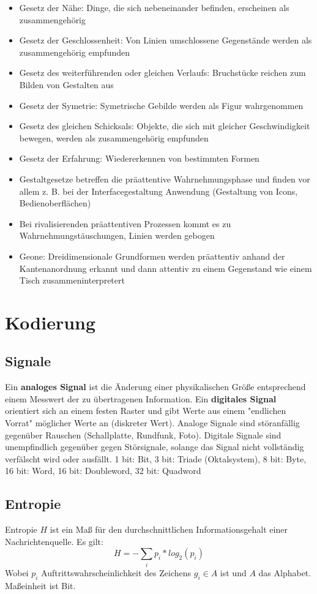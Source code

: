 \documentclass[12pt,landscape]{article}
\begin{document}
\begin{multicols}{3}
\begin{itemize}
\item Gesetz der Nähe: Dinge, die sich nebeneinander befinden, erscheinen als zusammengehörig
\item Gesetz der Geschlossenheit: Von Linien umschlossene Gegenstände werden als zusammengehörig empfunden
\item Gesetz des weiterführenden oder gleichen Verlaufs: Bruchstücke reichen zum Bilden von Gestalten aus
\item Gesetz der Symetrie: Symetrische Gebilde werden als Figur wahrgenommen
\item Gesetz des gleichen Schicksals: Objekte, die sich mit gleicher Geschwindigkeit bewegen, werden als zusammengehörig empfunden
\item Gesetz der Erfahrung: Wiedererkennen von bestimmten Formen
\item Gestaltgesetze betreffen die präattentive Wahrnehmungsphase und finden vor allem z. B. bei der Interfacegestaltung Anwendung (Gestaltung von Icons, Bedienoberflächen)
\item Bei rivalisierenden präattentiven Prozessen kommt es zu Wahrnehmungstäuschungen, Linien werden gebogen
\item Geone: Dreidimensionale Grundformen werden präattentiv anhand der Kantenanordnung erkannt und dann attentiv zu einem Gegenstand wie einem Tisch zusammeninterpretert
\end{itemize}
\section{Kodierung}
\subsection{Signale}
Ein \textbf{analoges Signal} ist die Änderung einer physikalischen Größe entsprechend einem Messwert der zu übertragenen Information. Ein \textbf{digitales Signal} orientiert sich an einem festen Raster und gibt Werte aus einem "endlichen Vorrat" möglicher Werte an (diskreter Wert).
Analoge Signale sind störanfällig gegenüber Rauschen (Schallplatte, Rundfunk, Foto). Digitale Signale sind unempfindlich gegenüber gegen Störsignale, solange das Signal nicht vollständig verfälscht wird oder ausfällt.
1 bit: Bit, 3 bit: Triade (Oktalsystem), 8 bit: Byte, 16 bit: Word, 16 bit: Doubleword, 32 bit: Quadword
\subsection{Entropie}
Entropie $H$ ist ein Maß für den durchschnittlichen Informationsgehalt einer Nachrichtenquelle. Es gilt:
\[ H = - \sum_{i}p_i * log_2(p_i) \]
Wobei $p_i$ Auftrittswahrscheinlichkeit des Zeichens $g_i \in A$ ist und $A$ das Alphabet. Maßeinheit ist Bit.

\end{multicols}
\end{document}
